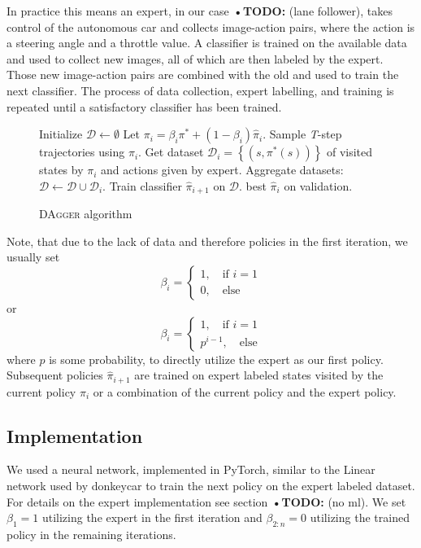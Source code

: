 \documentclass[conference]{IEEEtran}
\begin{document}
In practice this means an expert, in our case \textbf{•TODO:} (lane follower), takes control of the autonomous car and collects image-action pairs, where the action is a steering angle and a throttle value. A classifier is trained on the available data and used to collect new images, all of which are then labeled by the expert. Those new image-action pairs are combined with the old and used to train the next classifier. The process of data collection, expert labelling, and training is repeated until a satisfactory classifier has been trained.

\begin{figure}[h]
\begin{algorithmic}[1]
\STATE Initialize \(\mathcal{D}\gets \emptyset\)
\STATE Let \( \pi_i = \beta_i \pi^* + \left( 1- \beta_i\right)\hat{ \pi}_i \).
\STATE Sample \textit{T}-step trajectories using \( \pi_i \).
\STATE Get dataset \( \mathcal{D}_i = \left\{ \left( s, \pi^*(s)\right)\right\} \) of visited states by \( \pi_i \) and actions given by expert.
\STATE Aggregate datasets: \( \mathcal{D}\gets \mathcal{D} \cup \mathcal{D}_i \).
\STATE Train classifier \( \hat{ \pi}_{i+1} \) on \( \mathcal{D} \).
\ENDFOR
\RETURN best \( \hat{ \pi}_i \) on validation.
\end{algorithmic}
\caption{DA\textsc{gger} algorithm}
\label{fig:dagger}
\end{figure}

Note, that due to the lack of data and therefore policies in the first iteration, we usually set
\[
\beta_i = \begin{cases}
1,\quad\text{if }i=1\\
0,\quad\text{else}
\end{cases}
\]
or
\[
\beta_i = \begin{cases}
1,\quad\text{if }i=1\\
p^{i-1},\quad\text{else}
\end{cases}
\]
where \( p \) is some probability, to directly utilize the expert as our first policy. Subsequent policies \( \hat{ \pi}_{i+1} \) are trained on expert labeled states visited by the current policy \( \pi_i \) or a combination of the current policy and the expert policy.

\subsection{Implementation}
We used a neural network, implemented in PyTorch, similar to the Linear network used by donkeycar to train the next policy on the expert labeled dataset. For details on the expert implementation see section \textbf{•TODO:} (no ml). We set \( \beta_1 = 1 \) utilizing the expert in the first iteration and \( \beta_{2:n} = 0 \) utilizing the trained policy in the remaining iterations.
\end{document}
